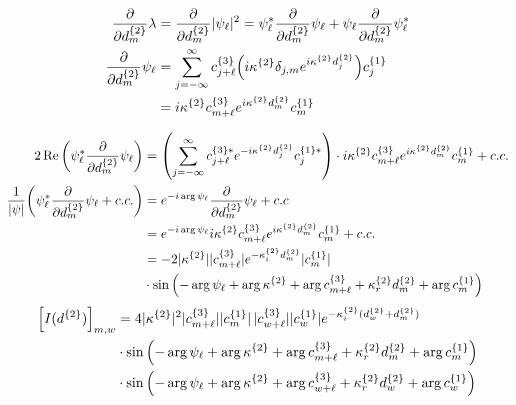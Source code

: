 \documentclass[12pt]{article}
\begin{document}
\begin{align*}
    \pdv{d^{\{2\}}_m} \lambda &= \pdv{d^{\{2\}}_m} |\psi_\ell|^2 = \psi_\ell^* \pdv{d^{\{2\}}_m} \psi_\ell + \psi_\ell \pdv{d^{\{2\}}_m} \psi_\ell^* \\
    \pdv{d^{\{2\}}_m} \psi_\ell &= 
    \sum_{j=-\infty}^{\infty} 
        c^{\{3\}}_{j + \ell} 
        \qty(i \kappa^{\{2\}} \delta_{j,m} e^{i \kappa^{\{2\}} d^{\{2\}}_j}) 
        c^{\{1\}}_j\\
    &= i \kappa^{\{2\}} 
        c^{\{3\}}_{m + \ell} 
        e^{i \kappa^{\{2\}} d^{\{2\}}_m} 
        c^{\{1\}}_m
\end{align*}


\begin{align*}
    2\Re\qty(\psi_\ell^* \pdv{d^{\{2\}}_m} \psi_\ell) &= 
    \qty(\sum_{j=-\infty}^{\infty} 
        c^{\{3\}*}_{j + \ell} 
        e^{-i \kappa^{\{2\}} d^{\{2\}}_j} 
        c^{\{1\}*}_j 
    )\cdot
        i \kappa^{\{2\}} 
        c^{\{3\}}_{m + \ell} 
        e^{i \kappa^{\{2\}} d^{\{2\}}_m} 
        c^{\{1\}}_m + c.c.\\
    \frac{1}{|\psi|}\qty(\psi_\ell^* \pdv{d^{\{2\}}_m} \psi_\ell + c.c.) &= 
    e^{-i \arg{\psi_\ell}}\pdv{d^{\{2\}}_m} \psi_\ell + c.c\\
    &= e^{-i \arg{\psi_\ell}} i \kappa^{\{2\}} 
        c^{\{3\}}_{m + \ell} 
        e^{i \kappa^{\{2\}} d^{\{2\}}_m} 
        c^{\{1\}}_m + c.c.\\
    &=-2 |\kappa^{\{2\}}| 
        |c^{\{3\}}_{m + \ell}|
        e^{-\kappa_i^{\{2\}} d^{\{2\}}_m}  
        |c^{\{1\}}_m|\\
        &\cdot \sin\qty(
            - \arg{\psi_\ell} 
            + \arg{\kappa^{\{2\}}}
            + \arg{c^{\{3\}}_{m + \ell}}
            + \kappa_r^{\{2\}} d^{\{2\}}_m 
            + \arg{c^{\{1\}}_m}
            )
\end{align*}
\begin{align*}
    \qty[I(d^{\{2\}})]_{m,w} &= 
    4 |\kappa^{\{2\}}|^2 
    |c^{\{3\}}_{m + \ell}|
    |c^{\{1\}}_m| \,
    |c^{\{3\}}_{w + \ell}|
    |c^{\{1\}}_w| e^{-\kappa_i^{\{2\}} (d^{\{2\}}_w+d^{\{2\}}_m)}   \\
    &\cdot \sin\qty(
        - \arg{\psi_\ell} 
        + \arg{\kappa^{\{2\}}}
        + \arg{c^{\{3\}}_{m + \ell}}
        + \kappa_r^{\{2\}} d^{\{2\}}_m 
        + \arg{c^{\{1\}}_m}
        )\\
    &\cdot \sin\qty(
        - \arg{\psi_\ell} 
        + \arg{\kappa^{\{2\}}}
        + \arg{c^{\{3\}}_{w + \ell}}
        + \kappa_r^{\{2\}} d^{\{2\}}_w 
        + \arg{c^{\{1\}}_w}
        )
\end{align*}
\end{document}
